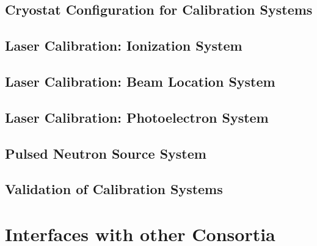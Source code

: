 \subsection{Cryostat Configuration for Calibration Systems}
\label{sec:sp-calib-cryostat}



\subsection{Laser Calibration: Ionization System}
\label{sec:sp-calib-sys-las-ion}


\subsection{Laser Calibration: Beam Location System}
\label{sec:sp-calib-sys-las-loc}


\subsection{Laser Calibration:  Photoelectron System}
\label{sec:sp-calib-sys-las-pe}


\subsection{Pulsed Neutron Source System}
\label{sec:sp-calib-sys-pns}


\subsection{Validation of Calibration Systems}
\label{sec:sp-calib-val}



\section{Interfaces with other Consortia}
\label{sec:sp-calib-intfc}

